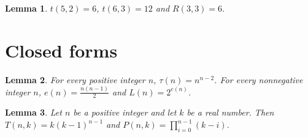 \documentclass{article}
\newtheorem{lemma}{Lemma}
\begin{document}
\begin{lemma}\label{turan}
$t(5,2)=6$, $t(6,3)=12$ and $R(3,3)=6$.
\end{lemma}

\section{Closed forms}

\begin{lemma}\label{cayley}
For every positive integer $n$, $\tau(n)=n^{n-2}$. For every nonnegative integer $n$, $e(n)=\frac{n(n-1)}{2}$ and $L(n)=2^{e(n)}$.
\end{lemma}

\begin{lemma}\label{trees-chromatic}
Let $n$ be a positive integer and let $k$ be a real number. Then $T(n,k)=k(k-1)^{n-1}$ and $P(n,k)=\prod_{i=0}^{n-1}(k-i)$.
\end{lemma}
\end{document}
